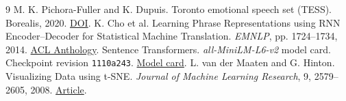 \documentclass[11pt,a4paper]{article}
\begin{document}
\begingroup\small
\setlength{\parskip}{0pt}
\begin{thebibliography}{9}
\setlength{\itemsep}{1pt}
 M. K. Pichora-Fuller and K. Dupuis. Toronto emotional speech set (TESS). Borealis, 2020. \href{https://doi.org/10.5683/SP2/E8H2MF}{DOI}.
 K. Cho et al. Learning Phrase Representations using RNN Encoder–Decoder for Statistical Machine Translation. \emph{EMNLP}, pp. 1724–1734, 2014. \href{https://aclanthology.org/D14-1179/}{ACL Anthology}.
 Sentence Transformers. \emph{all-MiniLM-L6-v2} model card. Checkpoint revision \texttt{1110a243}. \href{https://huggingface.co/sentence-transformers/all-MiniLM-L6-v2}{Model card}.
 L. van der Maaten and G. Hinton. Visualizing Data using t-SNE. \emph{Journal of Machine Learning Research}, 9, 2579–2605, 2008. \href{https://jmlr.org/papers/v9/vandermaaten08a.html}{Article}.
\end{thebibliography}
\endgroup
\end{document}
